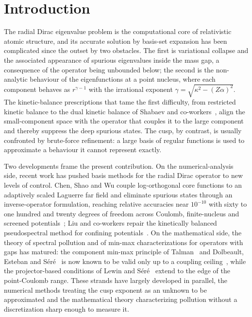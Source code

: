 \documentclass[aps,pra,twocolumn,superscriptaddress,showpacs,floatfix,longbibliography]{revtex4-2}
\newcommand{\Za}{\ensuremath{Z\alpha}}
\begin{document}
\maketitle

\section{Introduction}

The radial Dirac eigenvalue problem is the computational core of
relativistic atomic structure, and its accurate solution by basis-set
expansion has been complicated since the outset by two obstacles. The
first is variational collapse and the associated appearance of spurious
eigenvalues inside the mass gap, a consequence of the operator being
unbounded below; the second is the non-analytic behaviour of the
eigenfunctions at a point nucleus, where each component behaves as
$r^{\gamma-1}$ with the irrational exponent
$\gamma=\sqrt{\kappa^{2}-(\Za)^{2}}$. The kinetic-balance prescriptions
that tame the first difficulty, from restricted kinetic balance to the
dual kinetic balance of Shabaev and co-workers~\cite{Shabaev2004}, align
the small-component space with the operator that couples it to the large
component and thereby suppress the deep spurious states. The cusp, by
contrast, is usually confronted by brute-force refinement: a large basis
of regular functions is used to approximate a behaviour it cannot
represent exactly.

Two developments frame the present contribution. On the numerical-analysis
side, recent work has pushed basis methods for the radial Dirac operator to
new levels of control. Chen, Shao and Wu couple log-orthogonal core
functions to an adaptively scaled Laguerre far field and eliminate spurious
states through an inverse-operator formulation, reaching relative
accuracies near $10^{-10}$ with sixty to one hundred and twenty degrees of
freedom across Coulomb, finite-nucleus and screened
potentials~\cite{ChenShaoWu2026}; Liu and co-workers repair the
kinetically balanced pseudospectral method for confining
potentials~\cite{Liu2026}. On the mathematical side, the theory of
spectral pollution and of min-max characterizations for operators with
gaps has matured: the component min-max principle of
Talman~\cite{Talman1986} and Dolbeault, Esteban and
S\'er\'e~\cite{DES2000} is now known to be valid only up to a coupling
ceiling~\cite{MorozovMuller2015}, while the projector-based conditions of
Lewin and S\'er\'e~\cite{LewinSere2010} extend to the edge of the
point-Coulomb range. These strands have largely developed in parallel,
the numerical methods treating the cusp exponent as an unknown to be
approximated and the mathematical theory characterizing pollution without
a discretization sharp enough to measure it.
\end{document}
